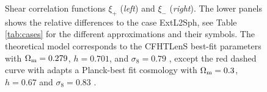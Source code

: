 \documentclass[fleqn,usenatbib]{mnras} %
\begin{document}
\begin{figure}
\begin{center}
  \end{center}

  \caption{Shear correlation functions $\xi_+$ (\emph{left}) and $\xi_-$ (\emph{right}).
    The lower panels shows the relative differences to the case ExtL2Sph,  see Table \ref{tab:cases} for the different
    approximations and their symbols.
    The theoretical model corresponds to the CFHTLenS best-fit parameters with
    $\Omega_{\rm m} = 0.279$, $h=0.701$, and $\sigma_8 = 0.79$ \citep{2015arXiv150201589P},
    except the red dashed curve with adapts a Planck-best fit
    cosmology with $\Omega_{\rm m} = 0.3$, $h=0.67$ and $\sigma_8 = 0.83$ \citep{2015arXiv150201589P}.
  }

  \label{fig:xi_pm_K16}

\end{figure}
\end{document}
